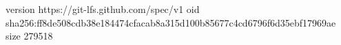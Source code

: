 version https://git-lfs.github.com/spec/v1
oid sha256:ff8de508cdb38e184474cfacab8a315d100b85677c4cd6796f6d35ebf17969ae
size 279518
